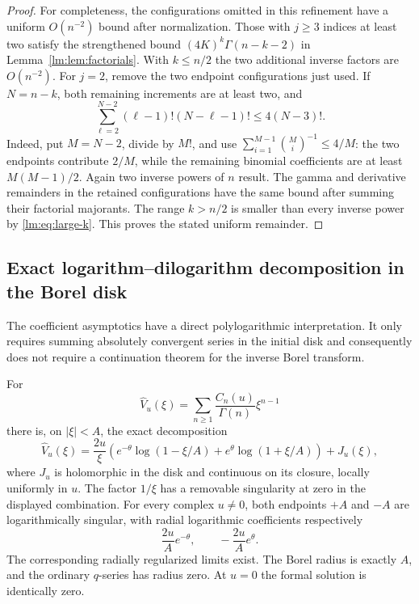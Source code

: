 \begin{proof}
For completeness, the configurations omitted in this refinement have
a uniform $O(n^{-2})$ bound after normalization.  Those with $j\geq3$
indices at least two satisfy the strengthened bound
$(4K)^k\Gamma(n-k-2)$ in Lemma~\ref{lm:lem:factorials}.  With
$k\leq n/2$ the two additional inverse factors are $O(n^{-2})$.
For $j=2$, remove the two endpoint configurations just used.  If
$N=n-k$, both remaining increments are at least two, and
\begin{equation}\label{lm:eq:two-interior}
 \sum_{\ell=2}^{N-2}(\ell-1)!(N-\ell-1)!
       \leq4(N-3)!.
\end{equation}
Indeed, put $M=N-2$, divide by $M!$, and use
$\sum_{i=1}^{M-1}\binom Mi^{-1}\leq4/M$: the two endpoints
contribute $2/M$, while the remaining binomial coefficients are at
least $M(M-1)/2$.  Again two inverse powers of $n$ result.  The
gamma and derivative remainders in the retained configurations have
the same bound after summing their factorial majorants.  The range
$k>n/2$ is smaller than every inverse power by
\eqref{lm:eq:large-k}.  This proves the stated uniform remainder.
\end{proof}

\subsection{Exact logarithm--dilogarithm decomposition in the Borel disk}
\label{lm:subsec:borel}

The coefficient asymptotics have a direct polylogarithmic interpretation.
It only requires summing absolutely convergent series in the initial
disk and consequently does not require a continuation theorem for the
inverse Borel transform.

\begin{corollary}
\label{lm:cor:logs}
For
\[
 \widehat V_u(\xi)=\sum_{n\geq1}\frac{C_n(u)}{\Gamma(n)}\xi^{n-1}
\]
there is, on $|\xi|<A$, the exact decomposition
\begin{equation}\label{lm:eq:log-decomposition}
 \widehat V_u(\xi)=\frac{2u}{\xi}
       \left(e^{-\theta}\log(1-\xi/A)
                     +e^{\theta}\log(1+\xi/A)\right)+J_u(\xi),
\end{equation}
where $J_u$ is holomorphic in the disk and continuous on its closure,
locally uniformly in $u$.  The factor $1/\xi$ has a removable
singularity at zero in the displayed combination.  For every complex
$u\ne0$, both endpoints $+A$ and $-A$ are logarithmically singular,
with radial logarithmic coefficients respectively
\begin{equation}\label{lm:eq:radial-amplitudes}
 \frac{2u}{A}e^{-\theta},\qquad -\frac{2u}{A}e^{\theta}.
\end{equation}
The corresponding radially regularized limits exist.  The Borel radius
is exactly $A$, and the ordinary $q$-series has radius zero.  At $u=0$
the formal solution is identically zero.
\end{corollary}

